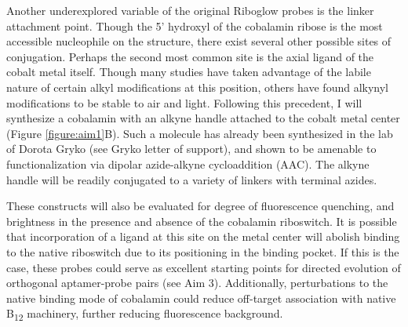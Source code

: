 Another underexplored variable of the original Riboglow probes is the linker attachment point.
Though the 5' hydroxyl of the cobalamin ribose is the most accessible nucleophile on the structure, there exist several other possible sites of conjugation.
Perhaps the second most common site is the axial ligand of the cobalt metal itself.
Though many studies have taken advantage of the labile nature of certain alkyl modifications at this position\cite{ShellVitaminB12Tunable2015}, others have found alkynyl modifications to be stable to air and light\cite{ChrominskiReductionfreesynthesisstable2013,RuetzMarkusPhenylethynylcobalaminLightStable2013}.
Following this precedent, I will synthesize a cobalamin with an alkyne handle attached to the cobalt metal center (Figure \ref{figure:aim1}B).
Such a molecule has already been synthesized in the lab of Dorota Gryko (see Gryko letter of support), and shown to be amenable to functionalization via dipolar azide-alkyne cycloaddition (AAC)\cite{ChrominskiVitaminB12Derivatives2014}.
The alkyne handle will be readily conjugated to a variety of linkers with terminal azides\cite{KolbHartmuthC.ClickChemistryDiverse2001,PattersonFindingRightBioorthogonal2014}.

These constructs will also be evaluated for degree of fluorescence quenching, and brightness in the presence and absence of the cobalamin riboswitch.
It is possible that incorporation of a ligand at this site on the metal center will abolish binding to the native riboswitch due to its positioning in the binding pocket\cite{JohnsonJrB12cofactorsdirectly2012}.
If this is the case, these probes could serve as excellent starting points for directed evolution of orthogonal aptamer-probe pairs (see Aim 3).
Additionally, perturbations to the native binding mode of cobalamin could reduce off-target association with native B\textsubscript{12} machinery\cite{PathareSynthesisCobalaminBiotin1996}, further reducing fluorescence background.

